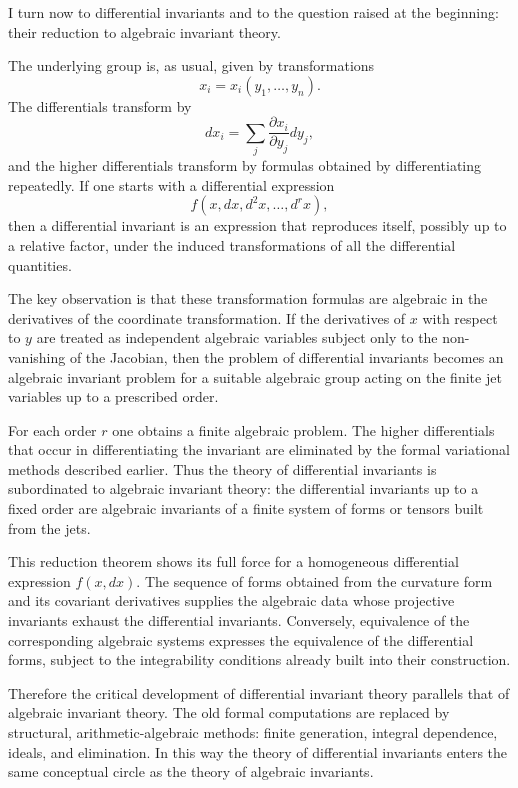 \documentclass[12pt]{article}
\begin{document}
I turn now to differential invariants and to the question raised at the beginning: their reduction to algebraic invariant theory.

The underlying group is, as usual, given by transformations
\begin{equation}
  x_i=x_i(y_1,\ldots,y_n).                                       \tag{4}
\end{equation}
The differentials transform by
\[
  dx_i=\sum_j \frac{\partial x_i}{\partial y_j}dy_j,
\]
and the higher differentials transform by formulas obtained by differentiating repeatedly. If one starts with a differential expression
\[
  f(x,dx,d^2x,\ldots,d^rx),
\]
then a differential invariant is an expression that reproduces itself, possibly up to a relative factor, under the induced transformations of all the differential quantities.

The key observation is that these transformation formulas are algebraic in the derivatives of the coordinate transformation. If the derivatives of $x$ with respect to $y$ are treated as independent algebraic variables subject only to the non-vanishing of the Jacobian, then the problem of differential invariants becomes an algebraic invariant problem for a suitable algebraic group acting on the finite jet variables up to a prescribed order.

For each order $r$ one obtains a finite algebraic problem. The higher differentials that occur in differentiating the invariant are eliminated by the formal variational methods described earlier. Thus the theory of differential invariants is subordinated to algebraic invariant theory: the differential invariants up to a fixed order are algebraic invariants of a finite system of forms or tensors built from the jets.

This reduction theorem shows its full force for a homogeneous differential expression $f(x,dx)$. The sequence of forms obtained from the curvature form and its covariant derivatives supplies the algebraic data whose projective invariants exhaust the differential invariants. Conversely, equivalence of the corresponding algebraic systems expresses the equivalence of the differential forms, subject to the integrability conditions already built into their construction.

Therefore the critical development of differential invariant theory parallels that of algebraic invariant theory. The old formal computations are replaced by structural, arithmetic-algebraic methods: finite generation, integral dependence, ideals, and elimination. In this way the theory of differential invariants enters the same conceptual circle as the theory of algebraic invariants.
\end{document}
